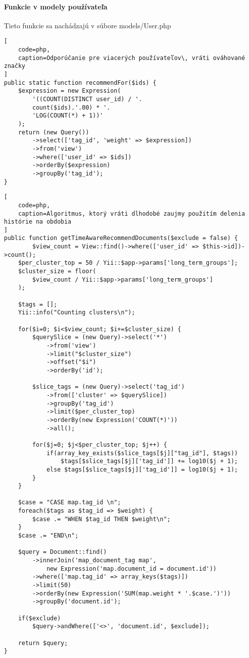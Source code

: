 \paragraph{Funkcie v modely používateľa}

Tieto funkcie sa nachádzajú v súbore models/User.php

\begin{lstlisting}[
    code=php,
    caption=Odporúčanie pre viacerých používateľov\, vráti ováhované značky
]
public static function recommendFor($ids) {
    $expression = new Expression(
        '((COUNT(DISTINCT user_id) / '.
        count($ids).'.00) * '.
        'LOG(COUNT(*) + 1))'
    );
    return (new Query())
        ->select(['tag_id', 'weight' => $expression])
        ->from('view')
        ->where(['user_id' => $ids])
        ->orderBy($expression)
        ->groupBy('tag_id');
}
\end{lstlisting}

\begin{lstlisting}[
    code=php,
    caption=Algoritmus, ktorý vráti dlhodobé zaujmy použitím delenia histórie na obdobia
]
public function getTimeAwareRecommendDocuments($exclude = false) {
        $view_count = View::find()->where(['user_id' => $this->id])->count();
    $per_cluster_top = 50 / Yii::$app->params['long_term_groups'];
    $cluster_size = floor(
        $view_count / Yii::$app->params['long_term_groups']
    );

    $tags = [];
    Yii::info("Counting clusters\n");

    for($i=0; $i<$view_count; $i+=$cluster_size) {
        $querySlice = (new Query)->select('*')
            ->from('view')
            ->limit("$cluster_size")
            ->offset("$i")
            ->orderBy('id');

        $slice_tags = (new Query)->select('tag_id')
            ->from(['cluster' => $querySlice])
            ->groupBy('tag_id')
            ->limit($per_cluster_top)
            ->orderBy(new Expression('COUNT(*)'))
            ->all();

        for($j=0; $j<$per_cluster_top; $j++) {
            if(array_key_exists($slice_tags[$j]["tag_id"], $tags))
                $tags[$slice_tags[$j]['tag_id']] += log10($j + 1);
            else $tags[$slice_tags[$j]['tag_id']] = log10($j + 1);
        }
    }

    $case = "CASE map.tag_id \n";
    foreach($tags as $tag_id => $weight) {
        $case .= "WHEN $tag_id THEN $weight\n";
    }
    $case .= "END\n";

    $query = Document::find()
        ->innerJoin('map_document_tag map',
            new Expression('map.document_id = document.id'))
        ->where(['map.tag_id' => array_keys($tags)])
        ->limit(50)
        ->orderBy(new Expression('SUM(map.weight * '.$case.')'))
        ->groupBy('document.id');

    if($exclude)
        $query->andWhere(['<>', 'document.id', $exclude]);

    return $query;
}
\end{lstlisting}

